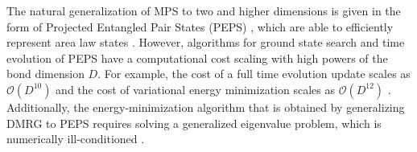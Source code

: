 The natural generalization of MPS to two and higher dimensions is given in the form of Projected Entangled Pair States (PEPS) \cite{cite:practical_introduction_MPS_and_PEPS, cite:renormalization_algorithms_for_qmb_systems_in_two_and_higher_dimensions}, which are able to efficiently represent area law states \cite{cite:practical_introduction_MPS_and_PEPS}. However, algorithms for ground state search and time evolution of PEPS have a computational cost scaling with high powers of the bond dimension $D$. For example, the cost of a full time evolution update scales as $\mathcal{O}(D^{10})$ and the cost of variational energy minimization scales as $\mathcal{O}(D^{12})$ \cite{cite:unifying_PEPS_contractions, cite:algorithms_for_finite_PEPS}. Additionally, the energy-minimization algorithm that is obtained by generalizing DMRG to PEPS requires solving a generalized eigenvalue problem, which is numerically ill-conditioned \cite{cite:algorithms_for_finite_PEPS}. \par

